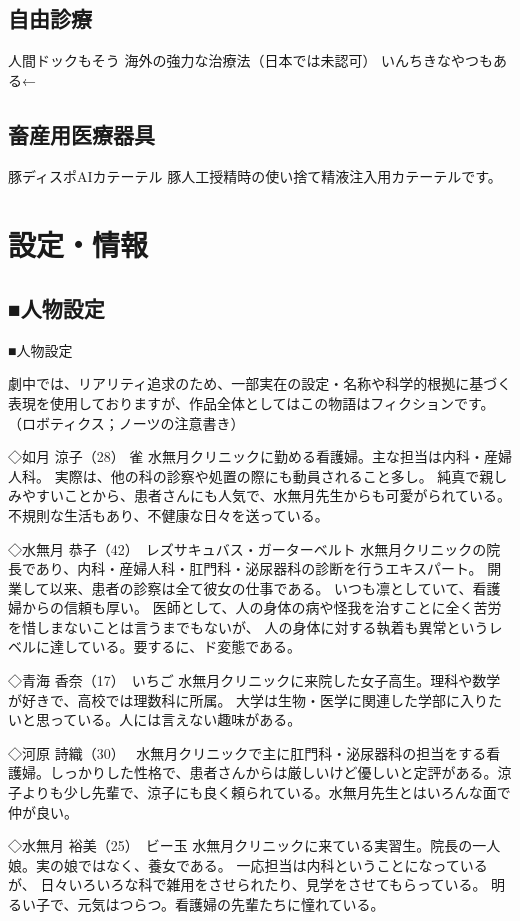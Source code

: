 \section{自由診療}
人間ドックもそう
海外の強力な治療法（日本では未認可）
いんちきなやつもある←

\section{畜産用医療器具}
豚ディスポAIカテーテル
豚人工授精時の使い捨て精液注入用カテーテルです。

\chapter{設定・情報}
\section{■人物設定}
■人物設定

劇中では、リアリティ追求のため、一部実在の設定・名称や科学的根拠に基づく表現を使用しておりますが、作品全体としてはこの物語はフィクションです。（ロボティクス；ノーツの注意書き）


◇如月 涼子（28） 雀
水無月クリニックに勤める看護婦。主な担当は内科・産婦人科。
実際は、他の科の診察や処置の際にも動員されること多し。
純真で親しみやすいことから、患者さんにも人気で、水無月先生からも可愛がられている。
不規則な生活もあり、不健康な日々を送っている。

◇水無月 恭子（42）　レズサキュバス・ガーターベルト
水無月クリニックの院長であり、内科・産婦人科・肛門科・泌尿器科の診断を行うエキスパート。
開業して以来、患者の診察は全て彼女の仕事である。
いつも凛としていて、看護婦からの信頼も厚い。
医師として、人の身体の病や怪我を治すことに全く苦労を惜しまないことは言うまでもないが、
人の身体に対する執着も異常というレベルに達している。要するに、ド変態である。

◇青海 香奈（17）　いちご
水無月クリニックに来院した女子高生。理科や数学が好きで、高校では理数科に所属。
大学は生物・医学に関連した学部に入りたいと思っている。人には言えない趣味がある。

◇河原 詩織（30）　
水無月クリニックで主に肛門科・泌尿器科の担当をする看護婦。しっかりした性格で、患者さんからは厳しいけど優しいと定評がある。涼子よりも少し先輩で、涼子にも良く頼られている。水無月先生とはいろんな面で仲が良い。

◇水無月 裕美（25）　ビー玉
水無月クリニックに来ている実習生。院長の一人娘。実の娘ではなく、養女である。
一応担当は内科ということになっているが、
日々いろいろな科で雑用をさせられたり、見学をさせてもらっている。
明るい子で、元気はつらつ。看護婦の先輩たちに憧れている。

